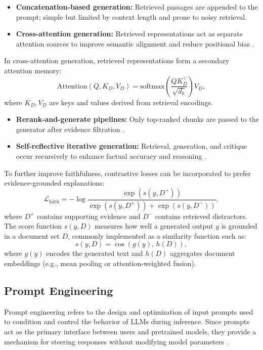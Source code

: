 \begin{itemize}
    \item \textbf{Concatenation-based generation:} Retrieved passages are appended to the prompt; simple but limited by context length and prone to noisy retrieval.
    \item \textbf{Cross-attention generation:} Retrieved representations act as separate attention sources to improve semantic alignment and reduce positional bias \cite{he2024retrieval_coding}.
\end{itemize}

In cross-attention generation, retrieved representations form a secondary attention memory:
\[
\text{Attention}(Q, K_D, V_D) = \text{softmax}\left(\frac{QK_D^\top}{\sqrt{d_k}}\right)V_D,
\]
where $K_D, V_D$ are keys and values derived from retrieval encodings.

\begin{itemize}
    \item \textbf{Rerank-and-generate pipelines:} Only top-ranked chunks are passed to the generator after evidence filtration \cite{zhang2024llm_hallucination_code}.
    \item \textbf{Self-reflective iterative generation:} Retrieval, generation, and critique occur recursively to enhance factual accuracy and reasoning \cite{asai2023selfrag}.
\end{itemize}

To further improve faithfulness, contrastive losses can be incorporated to prefer evidence-grounded explanations:
\[
\mathcal{L}_{\text{faith}} = -\log \frac{\exp(s(y, D^+))}{\exp(s(y, D^+)) + \exp(s(y, D^-))},
\]
where $D^+$ contains supporting evidence and $D^-$ contains retrieved distractors. The score function $s(y, D)$ measures how well a generated output $y$ is grounded in a document set $D$, commonly implemented as a similarity function such as:
\[
s(y, D) = \cos\left(g(y), \, h(D)\right),
\]
where $g(y)$ encodes the generated text and $h(D)$ aggregates document embeddings (e.g., mean pooling or attention-weighted fusion).

\subsection{Prompt Engineering}

Prompt engineering refers to the design and optimization of input prompts used to condition and control the behavior of LLMs during inference. Since prompts act as the primary interface between users and pretrained models, they provide a mechanism for steering responses without modifying model parameters \cite{brown2020language}.

